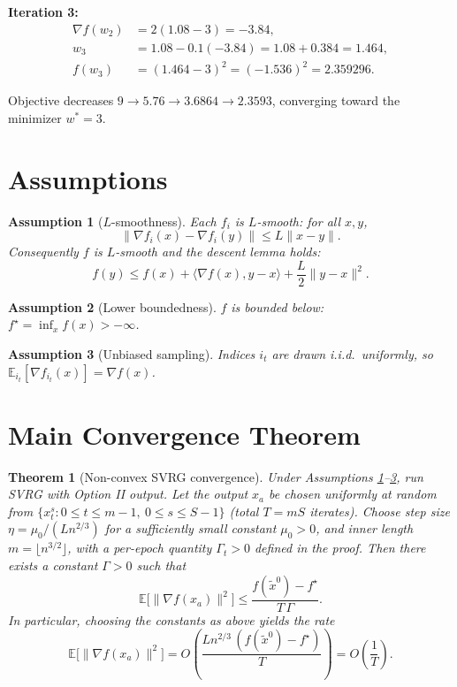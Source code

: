 \documentclass[11pt]{article}
\newtheorem{theorem}{Theorem}
\newtheorem{assumption}{Assumption}
\begin{document}
\textbf{Iteration 3:}
\begin{align*}
\nabla f(w_2) &= 2(1.08-3) = -3.84,\\
w_3 &= 1.08 - 0.1(-3.84) = 1.08 + 0.384 = 1.464,\\
f(w_3) &= (1.464-3)^2 = (-1.536)^2 = 2.359296.
\end{align*}

Objective decreases $9 \to 5.76 \to 3.6864 \to 2.3593$, converging toward the minimizer $w^*=3$.

\section*{Assumptions}

\begin{assumption}[$L$-smoothness]\label{a:smooth}
Each $f_i$ is $L$-smooth: for all $x,y$,
\[
\|\nabla f_i(x) - \nabla f_i(y)\| \le L\|x-y\|.
\]
Consequently $f$ is $L$-smooth and the descent lemma holds:
\[
f(y) \le f(x) + \langle \nabla f(x), y-x\rangle + \frac{L}{2}\|y-x\|^2.
\]
\end{assumption}

\begin{assumption}[Lower boundedness]\label{a:lb}
$f$ is bounded below: $f^\star = \inf_x f(x) > -\infty$.
\end{assumption}

\begin{assumption}[Unbiased sampling]\label{a:unbias}
Indices $i_t$ are drawn i.i.d.\ uniformly, so $\mathbb{E}_{i_t}[\nabla f_{i_t}(x)] = \nabla f(x)$.
\end{assumption}

\section*{Main Convergence Theorem}

\begin{theorem}[Non-convex SVRG convergence]\label{thm:main}
Under Assumptions \ref{a:smooth}--\ref{a:unbias}, run SVRG with Option II output.
Let the output $x_a$ be chosen uniformly at random from
$\{x_t^s : 0\le t \le m-1,\ 0\le s\le S-1\}$ (total $T=mS$ iterates).
Choose step size $\eta = \mu_0/(L n^{2/3})$ for a sufficiently small constant $\mu_0>0$,
and inner length $m = \lfloor n^{3/2} \rfloor$, with a per-epoch quantity
$\Gamma_t>0$ defined in the proof. Then there exists a constant $\Gamma>0$ such that
\[
\mathbb{E}\big[\|\nabla f(x_a)\|^2\big]
\le \frac{f(\tilde{x}^0) - f^\star}{T\,\Gamma}.
\]
In particular, choosing the constants as above yields the rate
\[
\mathbb{E}\big[\|\nabla f(x_a)\|^2\big] = O\!\left(\frac{L n^{2/3}\,(f(\tilde{x}^0)-f^\star)}{T}\right)
= O\!\left(\frac{1}{T}\right).
\]
\end{theorem}
\end{document}
